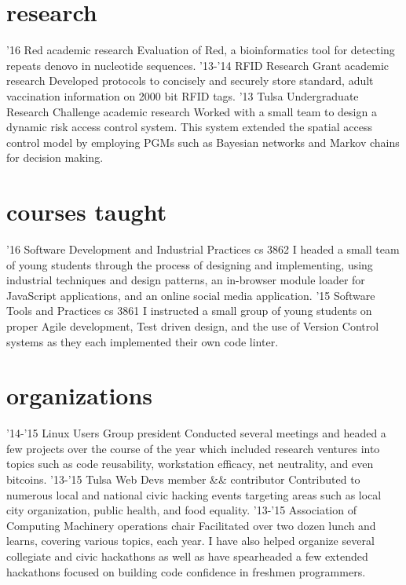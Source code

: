 \documentclass[]{friggeri-cv}
\begin{document}
\section{research}

\begin{entrylist}
  \entry
    {'16}
    {Red}
    {academic research}
    {Evaluation of Red, a bioinformatics tool for detecting repeats denovo in nucleotide sequences.}
  \entry
    {'13-'14}
    {RFID Research Grant}
    {academic research}
    {Developed protocols to concisely and securely store standard, adult vaccination information on 2000 bit RFID tags.}
  \entry
    {'13}
    {Tulsa Undergraduate Research Challenge}
    {academic research}
    {Worked with a small team to design a dynamic risk access control system. This system extended the spatial access control model by employing PGMs such as Bayesian networks and Markov chains for decision making.}
\end{entrylist}

\section{courses taught}

\begin{entrylist}
  \entry
    {'16}
    {Software Development and Industrial Practices}
    {cs 3862}
    {I headed a small team of young students through the process of designing and implementing, using industrial techniques and design patterns, an in-browser module loader for JavaScript applications, and an online social media application.}
  \entry
    {'15}
    {Software Tools and Practices}
    {cs 3861}
    {I instructed a small group of young students on proper Agile development, Test driven design, and the use of Version Control systems as they each implemented their own code linter.}
\end{entrylist}

\section{organizations}

\begin{entrylist}
  \entry
    {'14-'15}
    {Linux Users Group}
    {president}
    {Conducted several meetings and headed a few projects over the course of the year which included research ventures into topics such as code reusability, workstation efficacy, net neutrality, and even bitcoins.}
  \entry
    {'13-'15}
    {Tulsa Web Devs}
    {member \&\& contributor}
    {Contributed to numerous local and national civic hacking events targeting areas such as local city organization, public health, and food equality.}
  \entry
    {'13-'15}
    {Association of Computing Machinery}
    {operations chair}
    {Facilitated over two dozen lunch and learns, covering various topics, each year. I have also helped organize several collegiate and civic hackathons as well as have spearheaded a few extended hackathons focused on building code confidence in freshmen programmers.}
\end{entrylist}
\end{document}
